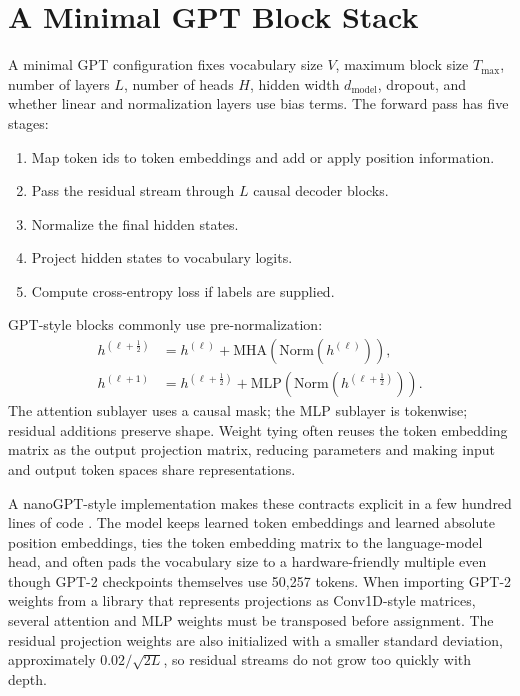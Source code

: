 \section{A Minimal GPT Block Stack}
\label{sec:minimal-gpt-block-stack}

A minimal GPT configuration fixes vocabulary size $V$, maximum block size $T_{\max}$, number of layers $L$, number of heads $H$, hidden width $d_{\mathrm{model}}$, dropout, and whether linear and normalization layers use bias terms. The forward pass has five stages:
\begin{enumerate}
\item Map token ids to token embeddings and add or apply position information.
\item Pass the residual stream through $L$ causal decoder blocks.
\item Normalize the final hidden states.
\item Project hidden states to vocabulary logits.
\item Compute cross-entropy loss if labels are supplied.
\end{enumerate}

GPT-style blocks commonly use pre-normalization:
\begin{align}
  h^{(\ell+\frac{1}{2})}
    &= h^{(\ell)}
       + \mathrm{MHA}(\mathrm{Norm}(h^{(\ell)})),\\
  h^{(\ell+1)}
    &= h^{(\ell+\frac{1}{2})}
       + \mathrm{MLP}(\mathrm{Norm}(h^{(\ell+\frac{1}{2})})).
\end{align}
The attention sublayer uses a causal mask; the MLP sublayer is tokenwise; residual additions preserve shape. Weight tying often reuses the token embedding matrix as the output projection matrix, reducing parameters and making input and output token spaces share representations.

A nanoGPT-style implementation makes these contracts explicit in a few hundred lines of code \cite{karpathy2022nanogpt}. The model keeps learned token embeddings and learned absolute position embeddings, ties the token embedding matrix to the language-model head, and often pads the vocabulary size to a hardware-friendly multiple even though GPT-2 checkpoints themselves use 50,257 tokens. When importing GPT-2 weights from a library that represents projections as Conv1D-style matrices, several attention and MLP weights must be transposed before assignment. The residual projection weights are also initialized with a smaller standard deviation, approximately $0.02/\sqrt{2L}$, so residual streams do not grow too quickly with depth.

